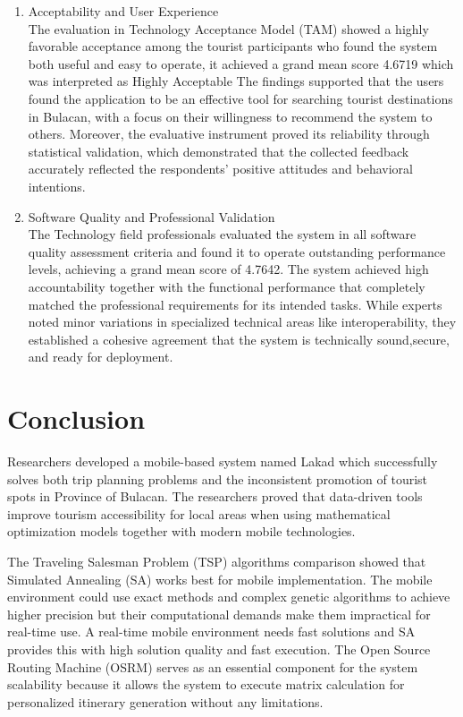 \begin{enumerate}
	\item Acceptability and User Experience\\
	The evaluation in Technology Acceptance Model (TAM) showed a highly favorable acceptance among the tourist participants who found the system both useful and easy to operate, it achieved a grand mean score 4.6719 which was interpreted as Highly Acceptable The findings supported that the users found the application to be an effective tool for searching tourist destinations in Bulacan, with a focus on their willingness to recommend the system to others. Moreover, the evaluative instrument proved its reliability through statistical validation, which demonstrated that the collected feedback accurately reflected the respondents’ positive attitudes and behavioral intentions. 
	\item Software Quality and Professional Validation\\
		The Technology field professionals evaluated the system in all software quality assessment criteria and found it to operate outstanding performance levels, achieving a grand mean score of 4.7642. The system achieved high accountability together with the functional performance that completely matched the professional requirements for its intended tasks. While experts noted minor variations in specialized technical areas like interoperability, they established a cohesive  agreement that the system is technically sound,secure, and ready for deployment.

\end{enumerate}

\section{Conclusion}
Researchers developed a mobile-based system named Lakad which successfully solves both trip planning problems and the inconsistent promotion of tourist spots in Province of Bulacan. The researchers proved that data-driven tools improve tourism accessibility for local areas when using mathematical optimization models together with modern mobile technologies. 

The Traveling Salesman Problem (TSP) algorithms comparison showed that Simulated Annealing (SA) works best for mobile implementation. The mobile environment could use exact methods and complex genetic algorithms to achieve higher precision but their computational demands make them impractical for real-time use. A real-time mobile environment needs fast solutions and SA provides this with high solution quality and fast execution. The Open Source Routing Machine (OSRM) serves as an essential component for the system scalability because it allows the system to execute matrix calculation for personalized itinerary generation without any limitations.

